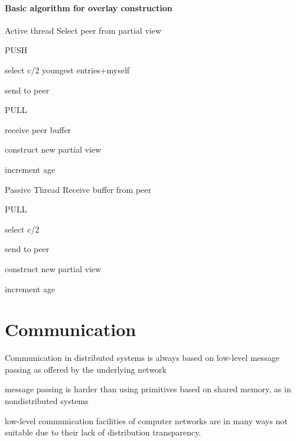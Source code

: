 \documentclass[ngerman,a4paper]{report}
\begin{document}
\subsubsection{Basic algorithm for overlay construction}

\begin{compactdesc}
	\item[Active thread] Select peer from partial view
	\begin{compactitem}
		\item[PUSH] \ 
		\begin{compactitem}
			\item select c/2 youngest entries+myself
			\item send to peer
		\end{compactitem}
		\item[PULL] \ 	
		\begin{compactitem}
			\item receive peer buffer
			\item construct new partial view
			\item increment age \\
		\end{compactitem}			
	\end{compactitem}
	\item[Passive Thread] Receive buffer from peer
	\begin{compactitem}
		\item[PULL] \ 	
		\begin{compactitem}
			\item select c/2
			\item send to peer
			\item construct new partial view
			\item increment age
		\end{compactitem}			
	\end{compactitem}	
\end{compactdesc}





\chapter{Communication}

\begin{compactitem}
	\item Communication in distributed systems is always based on low-level message passing as offered by the underlying network
	\item message passing is harder than using primitives based on shared memory, as in nondistributed systems
	\item low-level communication facilities of computer networks are in many ways not suitable due to their lack of distribution transparency.
\end{compactitem}
\end{document}
